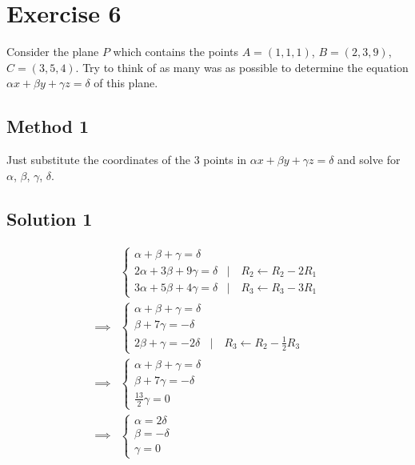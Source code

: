 \documentclass[a4paper,10pt]{article}
\begin{document}
\clearpage

\section{Exercise 6}

Consider the plane $P$ which contains the points $A = (1, 1, 1)$, $B = (2, 3, 9)$, $C = (3, 5, 4)$. Try to think of as many was as possible to determine the equation $\alpha x + \beta y + \gamma z = \delta$ of this plane.

\subsection{Method 1}
Just substitute the coordinates of the 3 points in $\alpha x + \beta y + \gamma z = \delta$ and solve for $\alpha$, $\beta$, $\gamma$, $\delta$.

\subsection{Solution 1}
\begin{align*}
     & \begin{cases}
           \alpha + \beta + \gamma = \delta                                        \\
           2\alpha + 3\beta + 9\gamma = \delta & |\quad R_2 \leftarrow R_2 - 2 R_1 \\
           3\alpha + 5\beta + 4\gamma = \delta & |\quad R_3 \leftarrow R_3 - 3 R_1
       \end{cases} \\ \implies &
    \begin{cases}
        \alpha + \beta + \gamma = \delta                                        \\
        \beta + 7\gamma = -\delta                                               \\
        2\beta + \gamma = -2\delta & |\quad R_3 \leftarrow R_2 - \frac{1}{2}R_3
    \end{cases}    \\ \implies &
    \begin{cases}
        \alpha + \beta + \gamma = \delta \\
        \beta + 7\gamma = -\delta        \\
        \frac{13}{2}\gamma = 0
    \end{cases}                                           \\ \implies &
    \begin{cases}
        \alpha = 2\delta \\
        \beta = -\delta  \\
        \gamma = 0
    \end{cases}
\end{align*}
\end{document}
